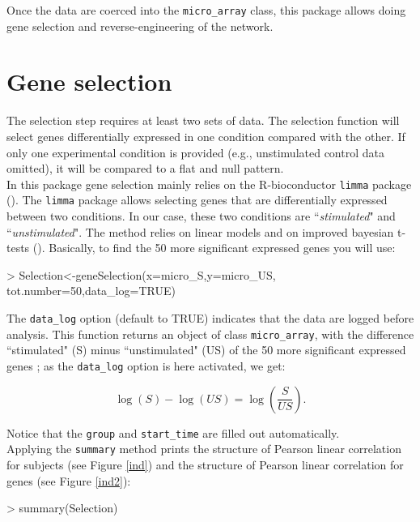 \documentclass[a4paper]{article}
\begin{document}
Once the data are coerced into the \texttt{micro\_array} class, this package allows doing gene selection and reverse-engineering of the network.



\section{Gene selection}


The selection step requires at least two sets of data. 
The selection function will select genes differentially expressed in one condition compared with the other.
If only one experimental condition is provided (e.g., unstimulated control data omitted), it will be compared to a flat and null pattern. \\ 


In this package gene selection mainly relies on the R-bioconductor \texttt{limma} package (\cite{limma}). The \texttt{limma} package allows selecting genes that are differentially expressed between two conditions. In our case, these two conditions are ``\textit{stimulated}" and ``\textit{unstimulated}". The method relies on linear models and on improved bayesian t-tests (\cite{limma}).  Basically, to find the 50 more significant expressed genes you will use:

\begin{Schunk}
\begin{Sinput}
> Selection<-geneSelection(x=micro_S,y=micro_US,
   tot.number=50,data_log=TRUE)
\end{Sinput}
\end{Schunk}

The \texttt{data\_log} option (default to TRUE) indicates that the data are logged before analysis. This function returns an object of class \texttt{micro\_array}, with the difference ``stimulated" (S) minus ``unstimulated" (US) of the 50 more significant expressed genes ; as the \texttt{data\_log} option is here activated, we get: 

$$
\log(S) - \log(US) = \log\left(\frac{S}{US}\right).
$$

Notice that the \texttt{group} and \texttt{start\_time} are filled out automatically. \\

Applying the \texttt{summary} method prints the structure of Pearson linear correlation for subjects (see Figure \ref{ind}) and the structure of Pearson linear correlation for genes (see Figure \ref{ind2}): 

\begin{Schunk}
\begin{Sinput}
> summary(Selection)
\end{Sinput}
\end{Schunk}
\end{document}
